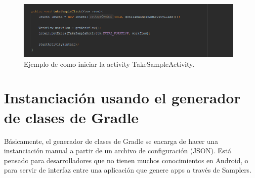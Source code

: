 \begin{itemize}
\begin{figure}[H]
  \centering
    \includegraphics[scale=0.6]{50-anexos/B-uso/take_sample_click.png} 
   \caption{Ejemplo de como iniciar la activity TakeSampleActivity.}
\end{figure}		

\end{itemize}


\section{Instanciación usando el  generador de clases de Gradle}

Básicamente, el generador de clases de Gradle se encarga de hacer una instanciación manual a partir de un archivo de configuración (JSON). Está pensado para desarrolladores que no tienen muchos conocimientos en Android, o para servir de interfaz entre una aplicación que genere apps a través de Samplers.

